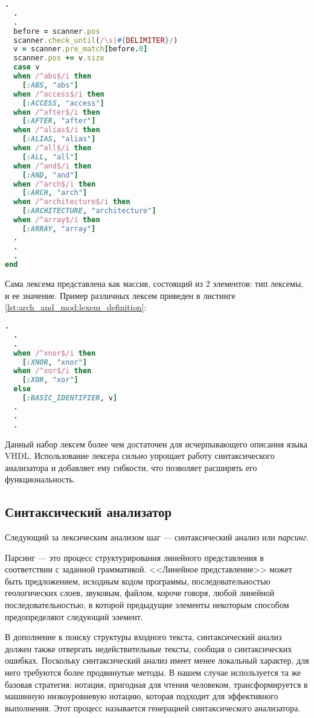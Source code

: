 \begin{lstlisting}[language=Ruby, style=rubystyle,caption={Проверка принадлежности части строки базовой конструкции языка}]
  .
  .
  .
  before = scanner.pos
  scanner.check_until(/\s|#{DELIMITER}/)
  v = scanner.pre_match[before.0]
  scanner.pos += v.size
  case v
  when /^abs$/i then
    [:ABS, "abs"]
  when /^access$/i then
    [:ACCESS, "access"]
  when /^after$/i then
    [:AFTER, "after"]
  when /^alias$/i then
    [:ALIAS, "alias"]
  when /^all$/i then
    [:ALL, "all"]
  when /^and$/i then
    [:AND, "and"]
  when /^arch$/i then
    [:ARCH, "arch"]
  when /^architecture$/i then
    [:ARCHITECTURE, "architecture"]
  when /^array$/i then
    [:ARRAY, "array"]
  .
  .
  .
end
\end{lstlisting}
Сама лексема представлена как массив, состоящий из 2 элементов: тип лексемы, и ее значение. Пример различных лексем приведен в листинге \ref{lst:arch_and_mod:lexem_definition}:
\begin{lstlisting}[language=Ruby, style=rubystyle,caption={Различные типы лексем}, label=lst:arch_and_mod:lexem_definition]
  .
  .
  .
  when /^xnor$/i then
    [:XNOR, "xnor"]
  when /^xor$/i then
    [:XOR, "xor"]
  else
    [:BASIC_IDENTIFIER, v]
  .
  .
  .
\end{lstlisting}

Данный набор лексем более чем достаточен для исчерпывающего описания языка VHDL. Использование лексера сильно упрощает работу синтаксического анализатора и добавляет ему гибкости, что позволяет расширять его функциональность.
\subsection{Синтаксический анализатор}
\label{sub:arch_and_mod:parser}
Следующий за лексическим анализом шаг --- синтаксический анализ или \textit{парсинг}.

Парсинг --- это процесс структурирования линейного представления в соответствии с заданной грамматикой. <<Линейное представление>> может быть предложением, исходным кодом программы, последовательностью геологических слоев, звуковым, файлом, короче говоря, любой линейной последовательностью, в которой предыдущие элементы некоторым способом предопределяют следующий элемент.

В дополнение к поиску структуры входного текста, синтаксический анализ должен также отвергать недействительные тексты, сообщая о синтаксических ошибках. Поскольку синтаксический анализ имеет менее локальный характер, для него требуются более продвинутые методы. В нашем случае используется та же базовая стратегия: нотация, пригодная для чтения человеком, трансформируется в машинную низкоуровневую нотацию, которая подходит для эффективного выполнения. Этот процесс называется генерацией синтаксического анализатора.

